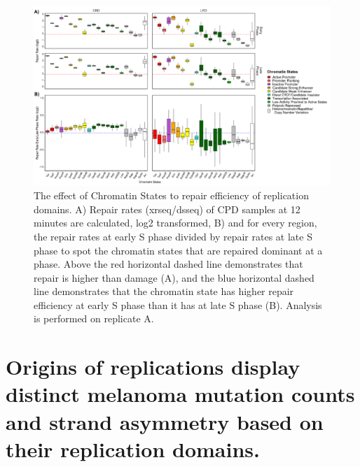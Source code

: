 \begin{figure}[H]
    \begin{center}
    \includegraphics[width=\textwidth]{Chapters/4_results/figures/fig3}
    \caption[The effect of Chromatin States to repair efficiency of replication domains.]{The effect of Chromatin States to repair efficiency of replication domains. A) Repair rates (\gls{xrseq}/\gls{dsseq}) of \gls{CPD} samples at 12 minutes are calculated, log2 transformed, B) and for every region, the repair rates at early S phase divided by repair rates at late S phase to spot the chromatin states that are repaired dominant at a phase. Above the red horizontal dashed line demonstrates that repair is higher than damage (A), and the blue horizontal dashed line demonstrates that the chromatin state has higher repair efficiency at early S phase than it has at late S phase (B). Analysis is performed on replicate A.}
    \label{fig:chromatin}
    \end{center}
    \end{figure}

\section{Origins of replications display distinct melanoma mutation counts and strand asymmetry based on their replication domains.}

